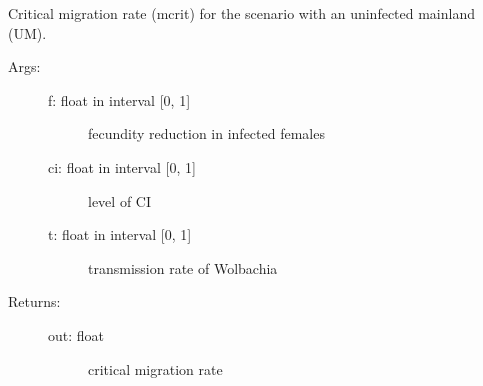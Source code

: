 \documentclass[letterpaper,10pt,english]{sphinxmanual}
\begin{document}
\begin{fulllineitems}
\label{index:wspec.analytical.mcrit_UM}
Critical migration rate (mcrit) for the scenario with an uninfected 
mainland (UM).
\begin{description}
\item[{Args:}] \leavevmode\begin{description}
\item[{f: float in interval {[}0, 1{]}}] \leavevmode
fecundity reduction in infected females

\item[{ci: float in interval {[}0, 1{]}}] \leavevmode
level of CI

\item[{t: float in interval {[}0, 1{]}}] \leavevmode
transmission rate of Wolbachia

\end{description}

\item[{Returns:}] \leavevmode\begin{description}
\item[{out: float}] \leavevmode
critical migration rate

\end{description}

\end{description}

\end{fulllineitems}

\end{document}
